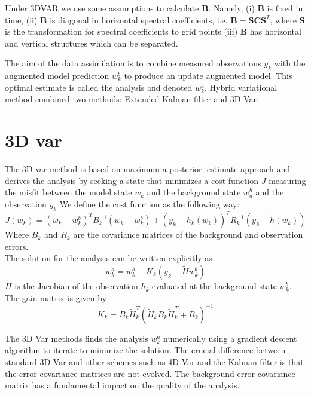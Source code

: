 \documentclass[a4,12pt]{article}
\numberwithin{equation}{section}
\begin{document}
Under 3DVAR we use some assumptions to calculate $\textbf{B}$. Namely, (i) $\textbf{B}$ is fixed in time, (ii) $\textbf{B}$ is diagonal in horizontal spectral coefficients, i.e. $\textbf{B} = \textbf{S}\textbf{C}\textbf{S}^{T}$, where $\textbf{S}$ is the transformation for spectral coefficients to grid points (iii) $\textbf{B}$ has horizontal and vertical structures which can be separated. 



The aim of the data assimilation is to combine measured observations $y_k$ with the augmented model prediction $w_k^b$ to produce an update augmented model. This optimal estimate is called the analysis and denoted $w_k^a$. Hybrid variational method combined two methods: Extended Kalman filter and 3D Var.

\section{3D var}
The 3D var method is based on maximum a posteriori estimate approach and derives the analysis by seeking a state that minimizes a cost function $J$ measuring the misfit between the model state $w_k$ and the background state $w_a^b$ and the observation $y_k$
We define  the cost function as the following way:
\begin{equation}
    J(w_k) = (w_k - w_k^b)^T B_k^{-1} (w_k - w_k^b) + (y_k - \tilde h_k (w_k)) ^T R_k^{-1} (y_k - \tilde h (w_k)) 
\label{costFunc}
\end{equation}
Where $B_k$ and $R_k$ are the covariance matrices of the background and observation errors. \\
The solution for the analysis can be written explicitly as 
\begin{equation}
    w_k^a = w_k^b + K_k (y_k - \tilde H w_k^b)
\label{sol3D}
\end{equation}
$\tilde H$ is the Jacobian of the observation $\tilde h_k$ evaluated at the background state $w_k^b$. \\
The gain matrix is given by
\begin{equation}
    K_k =  B_k \tilde H_k^T(  \tilde H_k B_k \tilde H_k^T + R_k)^{-1}
\label{matrixGain3D}
\end{equation}


The 3D Var methods finds the analysis $w_k^a$ numerically using a gradient descent algorithm to iterate to minimize the solution.
The crucial difference between standard 3D Var and other schemes such as 4D Var and the Kalman filter is that the error covariance matrices are not evolved. The background error covariance matrix has a fundamental impact on the quality of the analysis.
\end{document}
